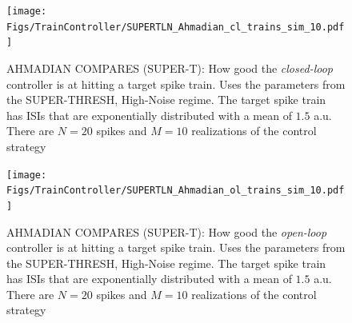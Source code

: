\documentclass[12pt]{iopart}
\begin{document}
\begin{figure}[htp]
\begin{center}
  \texttt{[image: Figs/TrainController/SUPERTLN\_Ahmadian\_cl\_trains\_sim\_10.pdf]}
  \caption[ ]{AHMADIAN COMPARES (SUPER-T): How good the {\sl closed-loop}
  controller is at hitting a target spike train. Uses the parameters from the
  SUPER-THRESH, High-Noise regime. The target spike train has ISIs that are exponentially distributed with a
  mean of $1.5$ a.u. There are $N=20$ spikes and $M=10$ realizations of the
  control strategy}
  \label{fig:targettrain_cl_critlownoise}
\end{center}
\end{figure}
\begin{figure}[htp]
\begin{center}
  \texttt{[image: Figs/TrainController/SUPERTLN\_Ahmadian\_ol\_trains\_sim\_10.pdf]}
  \caption[ ]{AHMADIAN COMPARES (SUPER-T): How good the {\sl open-loop}
  controller is at hitting a target spike train. Uses the parameters from the
  SUPER-THRESH, High-Noise regime. The target spike train has ISIs that are
  exponentially distributed with a mean of $1.5$ a.u. There are $N=20$ spikes and $M=10$ realizations of the
  control strategy}
  \label{fig:targettrain_ol_critlownoise}
\end{center}
\end{figure}
\clearpage
\end{document}
